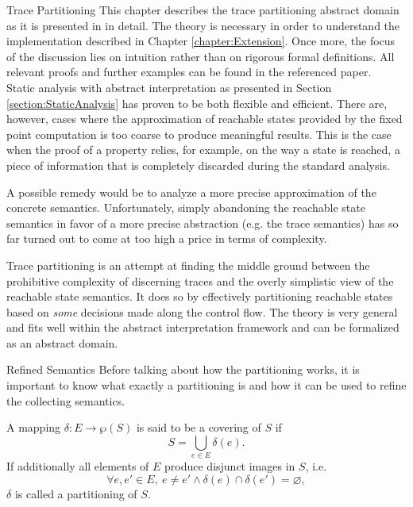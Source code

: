 %

\begin{chapter}{Trace Partitioning}
	\label{chapter:TracePartitioning}
	This chapter describes the trace partitioning abstract domain as it is presented in \cite{mauborgne:rival07, mauborgne:rival05} in detail. The theory is necessary in order to understand the implementation described in Chapter \ref{chapter:Extension}. Once more, the focus of the discussion lies on intuition rather than on rigorous formal definitions. All relevant proofs and further examples can be found in the referenced paper.\\

	Static analysis with abstract interpretation as presented in Section \ref{section:StaticAnalysis} has proven to be both flexible and efficient. There are, however, cases where the approximation of reachable states provided by the fixed point computation is too coarse to produce meaningful results. This is the case when the proof of a property relies, for example, on the way a state is reached, a piece of information that is completely discarded during the standard analysis.

	A possible remedy would be to analyze a more precise approximation of the concrete semantics. Unfortunately, simply abandoning the reachable state semantics in favor of a more precise abstraction (e.g. the trace semantics) has so far turned out to come at too high a price in terms of complexity.

	Trace partitioning is an attempt at finding the middle ground between the prohibitive complexity of discerning traces and the overly simplistic view of the reachable state semantics. It does so by effectively partitioning reachable states based on \emph{some} decisions made along the control flow. The theory is very general and fits well within the abstract interpretation framework and can be formalized as an abstract domain.


	\begin{section}{Refined Semantics}
		Before talking about how the partitioning works, it is important to know what exactly a partitioning is and how it can be used to refine the collecting semantics.

		\begin{definition}
			\label{definition:coveringpartition}
			A mapping $\delta: E \to \wp(S)$ is said to be a covering of $S$ if
			\begin{equation}
				S = \bigcup_{e \in E} \delta(e).
			\end{equation}
			If additionally all elements of $E$ produce disjunct images in $S$, i.e.
			\begin{equation}
				\forall e, e' \in E, \ e \neq e' \land \delta(e) \cap \delta(e') = \varnothing,
			\end{equation}
			$\delta$ is called a partitioning of $S$.
		\end{definition}


\end{section}
\end{chapter}
